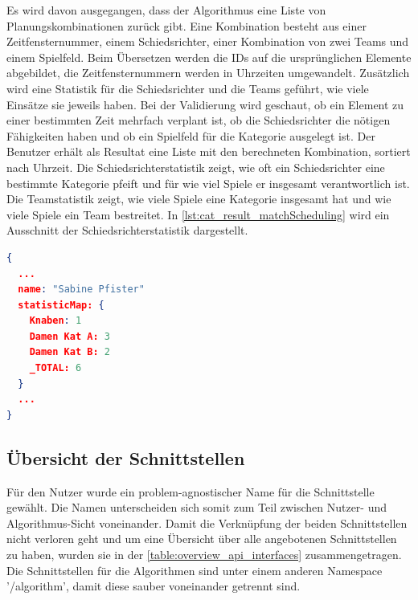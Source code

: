 Es wird davon ausgegangen, dass der Algorithmus eine Liste von Planungskombinationen zurück gibt. Eine Kombination besteht aus einer Zeitfensternummer, einem Schiedsrichter, 
einer Kombination von zwei Teams und einem Spielfeld. Beim Übersetzen werden die IDs auf die ursprünglichen Elemente abgebildet, die Zeitfensternummern werden in Uhrzeiten 
umgewandelt. Zusätzlich wird eine Statistik für die Schiedsrichter und die Teams geführt, wie viele Einsätze sie jeweils haben. Bei der Validierung wird geschaut, ob ein Element zu einer 
bestimmten Zeit mehrfach verplant ist, ob die Schiedsrichter die nötigen Fähigkeiten haben und ob ein Spielfeld für die Kategorie ausgelegt ist. Der Benutzer erhält als Resultat eine Liste 
mit den berechneten Kombination, sortiert nach Uhrzeit. Die Schiedsrichterstatistik zeigt, wie oft ein Schiedsrichter eine bestimmte Kategorie pfeift und für wie viel Spiele er insgesamt 
verantwortlich ist. Die Teamstatistik zeigt, wie viele Spiele eine Kategorie insgesamt hat und wie viele Spiele ein Team bestreitet. In \autoref{lst:cat_result_matchScheduling} wird ein 
Ausschnitt der Schiedsrichterstatistik dargestellt.

\begin{lstlisting}[language=JSON, caption=Ausschnitt eines Resultats einer Spielplan Erstellung, label=lst:cat_result_matchScheduling]  
{
  ...
  name: "Sabine Pfister"
  statisticMap: {
    Knaben: 1
    Damen Kat A: 3
    Damen Kat B: 2
    _TOTAL: 6
  }
  ...
}
\end{lstlisting}

\subsection{Übersicht der Schnittstellen}
Für den Nutzer wurde ein problem-agnostischer Name für die Schnittstelle gewählt. Die Namen unterscheiden sich somit zum Teil zwischen Nutzer- und Algorithmus-Sicht voneinander. Damit die 
Verknüpfung der beiden Schnittstellen nicht verloren geht und um eine Übersicht über alle angebotenen Schnittstellen zu haben, wurden sie in der \autoref{table:overview_api_interfaces} 
zusammengetragen. Die Schnittstellen für die Algorithmen sind unter einem anderen Namespace '/algorithm', damit diese sauber voneinander getrennt sind.

